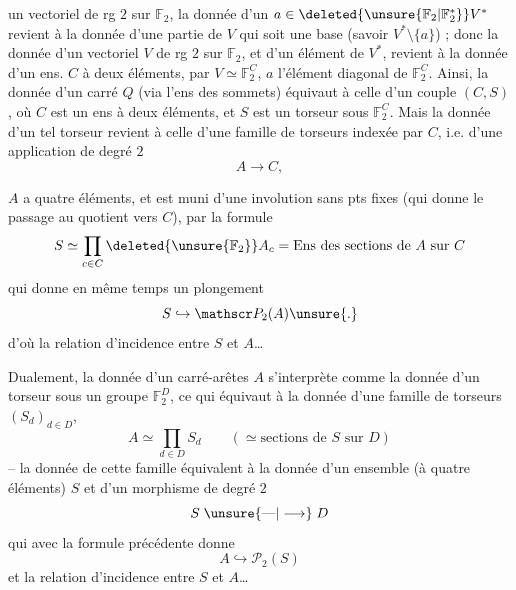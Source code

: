 un vectoriel  de rg $2$ sur $\mathbb F_2$, la donnée d'un $a\in\deleted{\unsure{\mathbb F_2|\mathbb F_2^*}}V^*$ revient à la donnée d'une partie de $V$ qui soit une base (savoir $V^*\setminus\{a\}$) ; donc la donnée d'un  vectoriel $V$ de rg $2$ sur $\mathbb F_2$, et d'un élément  de $V^*$, revient à la donnée d'un ens. $C$ à deux éléments, par $V\simeq\mathbb F_2^C$, $a$ l'élément diagonal de $\mathbb F_2^C$. Ainsi, la donnée d'un carré $Q$  (via l'ens des sommets) équivaut à celle d'un couple $(C,S)$, où $C$  est un ens à deux éléments, et $S$ est un torseur sous $\mathbb F_2^C$. Mais la donnée d'un tel torseur revient à celle d'une famille de torseurs indexée par $C$, i.e. d'une application de degré $2$
\[
A\longrightarrow C,
\]

$A$ a quatre éléments, et est muni d'une involution sans pts fixes (qui donne le passage au quotient vers $C$), par la formule
\[
S\simeq\prod_{c\in C}\deleted{\unsure{\mathbb F_2}} A_c=\text{Ens des sections de } A\text{ sur } C
\]
qui donne en même temps un plongement
\[
S\hookrightarrow\mathscr P_2(A)\unsure{.}
\]
d'où la relation d'incidence entre $S$ et $A$\ldots



Dualement,  la donnée d'un carré-arêtes $A$ s'interprète comme la donnée d'un torseur sous un groupe $\mathbb F_2^D$, ce qui équivaut à la donnée d'une famille de torseurs $(S_d)_{d\in D}$,  
\[
A\simeq\prod_{d\in D}S_d\qquad(\simeq\text{sections de }S\text{ sur }D)
\]
-- la donnée de cette famille équivalent à la donnée d'un ensemble (à quatre éléments) $S$ et d'un morphisme de degré $2$
\[
S\mathrel{\unsure{\text{---}|\longrightarrow}}D
\]
qui avec la formule précédente donne
\[
A\hookrightarrow\mathscr P_2(S)
\]
et la relation d'incidence entre $S$ et $A$\ldots


